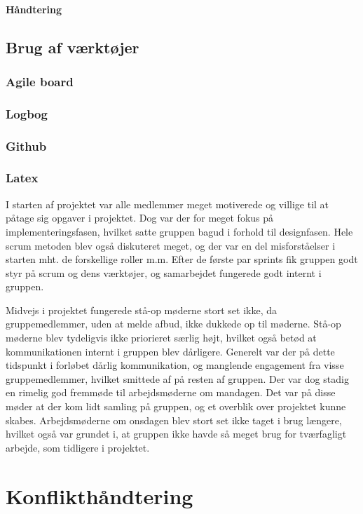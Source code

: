 \paragraph{Håndtering}

\subsection{Brug af værktøjer}
\subsubsection{Agile board}
\subsubsection{Logbog}
\subsubsection{Github}
\subsubsection{Latex}

I starten af projektet var alle medlemmer meget motiverede og villige til at påtage sig opgaver i projektet. Dog var der for meget fokus på implementeringsfasen,
hvilket satte gruppen bagud i forhold til designfasen.
Hele scrum metoden blev også diskuteret meget, og der var en del misforståelser i starten mht. de forskellige roller m.m. Efter de første par sprints
fik gruppen godt styr på scrum og dens værktøjer, og samarbejdet fungerede godt internt i gruppen.

Midvejs i projektet fungerede stå-op møderne stort set ikke, da gruppemedlemmer, uden at melde afbud, ikke dukkede op til møderne. Stå-op møderne
blev tydeligvis ikke priorieret særlig højt, hvilket også betød at kommunikationen internt i gruppen blev dårligere. Generelt var der på dette tidspunkt i forløbet
dårlig kommunikation, og manglende engagement fra visse gruppemedlemmer, hvilket smittede af på resten af gruppen.
Der var dog stadig en rimelig god fremmøde til arbejdsmøderne om mandagen. Det var på disse møder at der kom lidt samling på gruppen, og et overblik over projektet
kunne skabes. Arbejdsmøderne om onsdagen blev stort set ikke taget i brug længere, hvilket også var grundet i, at gruppen ikke havde så meget brug
for tværfagligt arbejde, som tidligere i projektet.

\section{Konflikthåndtering}

